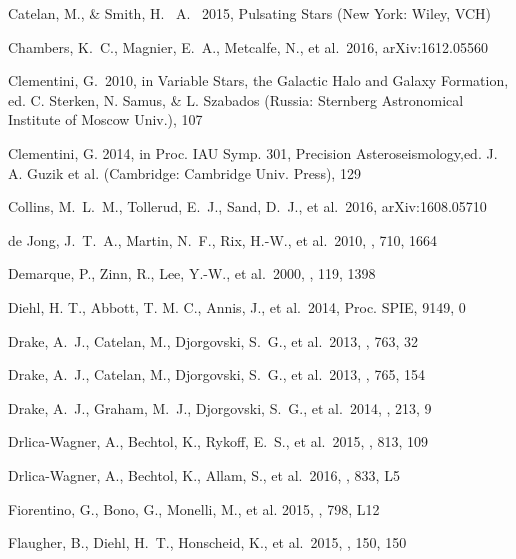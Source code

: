 \documentclass[iop]{emulateapj}
\begin{document}
\begin{thebibliography}{}
 Catelan, M., \& Smith, H. ~A. \ 2015, Pulsating Stars (New York: Wiley, VCH)

 Chambers, K.~C., Magnier, E.~A., Metcalfe, N., et al.\ 2016, arXiv:1612.05560

 Clementini, G.\ 2010, in Variable Stars, the Galactic Halo and Galaxy Formation, ed. C. Sterken, N. Samus, \& L. Szabados (Russia: Sternberg Astronomical Institute of Moscow Univ.), 107

 Clementini, G. 2014, in Proc. IAU Symp. 301, Precision Asteroseismology,ed. J. A. Guzik et al. (Cambridge: Cambridge Univ. Press), 129

 Collins, M.~L.~M., Tollerud, 
E.~J., Sand, D.~J., et al.\ 2016, arXiv:1608.05710

 de Jong, J.~T.~A., Martin, N.~F., Rix, H.-W., et al.\ 2010, \apj, 710, 1664 

 Demarque, P., Zinn, 
R., Lee, Y.-W., et al.\ 2000, \aj, 119, 1398 

 Diehl, H. T., Abbott, T. M. C., Annis, J., et al.\ 2014, Proc. SPIE, 9149, 0 

 Drake, A.~J., Catelan, 
M., Djorgovski, S.~G., et al.\ 2013, \apj, 763, 32 

 Drake, A.~J., Catelan, M., Djorgovski, S.~G., et al.\ 2013, \apj, 765, 154 

 Drake, A.~J., Graham, M.~J., Djorgovski, S.~G., et al.\ 2014, \apjs, 213, 9 

 Drlica-Wagner, A., Bechtol, K., Rykoff, E.~S., et al.\ 2015, \apj, 813, 109

 Drlica-Wagner, A., Bechtol, K., Allam, S., et al.\ 2016, \apjl, 833, L5

Fiorentino, G., Bono, G., Monelli, M., et al. 2015, \apjl, 798, L12

 Flaugher, B., Diehl, H.~T., Honscheid, K., et al.\ 2015, \aj, 150, 150 


\end{thebibliography}
\end{document}
